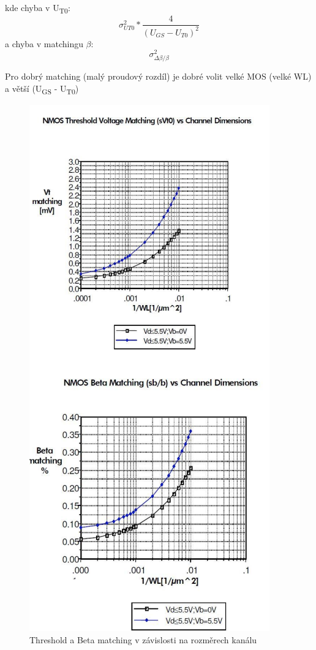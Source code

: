 kde chyba v U\textsubscript{T0}:
\begin{equation}
\sigma_{UT0}^2*\frac{4}{(U_{GS}-U_{T0})^2}
\end{equation}
a chyba v matchingu $\beta$:
\begin{equation}
\sigma_{\Delta \beta / \beta}^2
\end{equation}

Pro dobrý matching (malý proudový rozdíl) je dobré volit velké MOS (velké WL) a větší (U\textsubscript{GS} - U\textsubscript{T0})

\begin{figure}[h]
   \begin{center}
     \includegraphics[scale=0.7]{images/grafy.png}
   \end{center}
   \caption{Threshold a Beta matching v závislosti na rozměrech kanálu}
\end{figure}

















